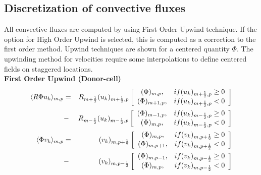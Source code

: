 \subsection{Discretization of convective fluxes}
All convective fluxes are computed by using First Order Upwind technique.
If the option for High Order Upwind is selected, this is computed as
a correction to the first order method. Upwind techniques are shown for
a centered quantity $\Phi$. The upwinding method for velocities
require some interpolations to define centered fields on staggered locations.\\

{\bf First Order Upwind (Donor-cell)}
%
\begin{eqnarray}
\htmlimage{}
%
\langle R \Phi u_k \rangle_{m,p} & = & R_{m+\frac{1}{2}} (u_k)_{m+\frac{1}{2},p} 
\left[ \begin{array}{cc}
\displaystyle{(\Phi)_{m,p}}, & \displaystyle if (u_k)_{m+\frac{1}{2},p}  \ge 0 \\
\displaystyle{(\Phi)_{m+1,p}}, & \displaystyle if (u_k)_{m+\frac{1}{2},p} < 0
\end{array} \right] \\ \nonumber
%
                                 & - & R_{m-\frac{1}{2}} (u_k)_{m-\frac{1}{2},p}
\left[ \begin{array}{cc}
\displaystyle{(\Phi)_{m-1,p}}, & \displaystyle if (u_k)_{m-\frac{1}{2},p}  \ge 0 \\
\displaystyle{(\Phi)_{m,p}}, & \displaystyle if (u_k)_{m-\frac{1}{2},p} < 0
\end{array} \right] \\ \nonumber
%
\langle \Phi v_k \rangle_{m,p} & = & (v_k)_{m,p+\frac{1}{2}}
\left[ \begin{array}{cc}
\displaystyle{(\Phi)_{m,p}}, & \displaystyle if (v_k)_{m,p+\frac{1}{2}}  \ge 0 \\
\displaystyle{(\Phi)_{m,p+1}}, & \displaystyle if (v_k)_{m,p+\frac{1}{2}} < 0
\end{array} \right] \\ \nonumber
%
                               & - & (v_k)_{m,p-\frac{1}{2}}
\left[ \begin{array}{cc}
\displaystyle{(\Phi)_{m,p-1}}, & \displaystyle if (v_k)_{m,p-\frac{1}{2}}  \ge 0 \\
\displaystyle{(\Phi)_{m,p}}, & \displaystyle if (v_k)_{m,p-\frac{1}{2}} < 0
\end{array} \right] \nonumber
%
\end{eqnarray}

